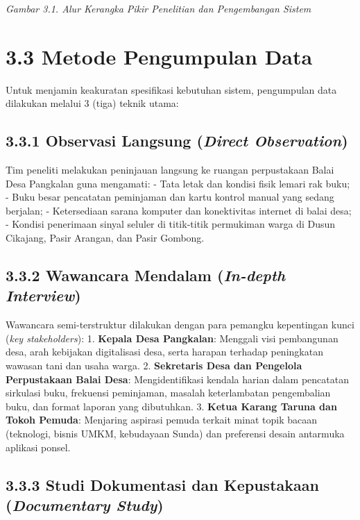 \documentclass[
  indonesian,
  12pt,
]{report}
\begin{document}
\emph{Gambar 3.1. Alur Kerangka Pikir Penelitian dan Pengembangan
Sistem}

\section{3.3 Metode Pengumpulan Data}\label{metode-pengumpulan-data}

Untuk menjamin keakuratan spesifikasi kebutuhan sistem, pengumpulan data
dilakukan melalui 3 (tiga) teknik utama:

\subsection{\texorpdfstring{3.3.1 Observasi Langsung (\emph{Direct
Observation})}{3.3.1 Observasi Langsung (Direct Observation)}}\label{observasi-langsung-direct-observation}

Tim peneliti melakukan peninjauan langsung ke ruangan perpustakaan Balai
Desa Pangkalan guna mengamati: - Tata letak dan kondisi fisik lemari rak
buku; - Buku besar pencatatan peminjaman dan kartu kontrol manual yang
sedang berjalan; - Ketersediaan sarana komputer dan konektivitas
internet di balai desa; - Kondisi penerimaan sinyal seluler di
titik-titik permukiman warga di Dusun Cikajang, Pasir Arangan, dan Pasir
Gombong.

\subsection{\texorpdfstring{3.3.2 Wawancara Mendalam (\emph{In-depth
Interview})}{3.3.2 Wawancara Mendalam (In-depth Interview)}}\label{wawancara-mendalam-in-depth-interview}

Wawancara semi-terstruktur dilakukan dengan para pemangku kepentingan
kunci (\emph{key stakeholders}): 1. \textbf{Kepala Desa Pangkalan}:
Menggali visi pembangunan desa, arah kebijakan digitalisasi desa, serta
harapan terhadap peningkatan wawasan tani dan usaha warga. 2.
\textbf{Sekretaris Desa dan Pengelola Perpustakaan Balai Desa}:
Mengidentifikasi kendala harian dalam pencatatan sirkulasi buku,
frekuensi peminjaman, masalah keterlambatan pengembalian buku, dan
format laporan yang dibutuhkan. 3. \textbf{Ketua Karang Taruna dan Tokoh
Pemuda}: Menjaring aspirasi pemuda terkait minat topik bacaan
(teknologi, bisnis UMKM, kebudayaan Sunda) dan preferensi desain
antarmuka aplikasi ponsel.

\subsection{\texorpdfstring{3.3.3 Studi Dokumentasi dan Kepustakaan
(\emph{Documentary
Study})}{3.3.3 Studi Dokumentasi dan Kepustakaan (Documentary Study)}}\label{studi-dokumentasi-dan-kepustakaan-documentary-study}
\end{document}
